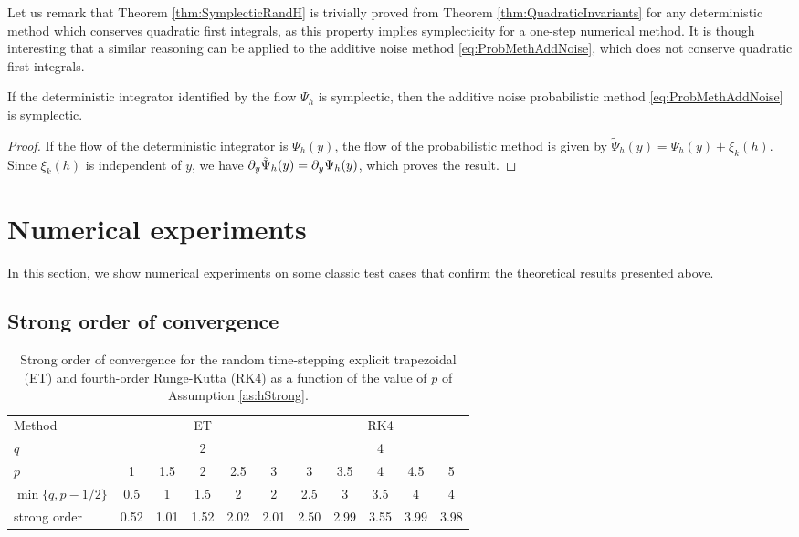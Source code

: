 \documentclass{siamart1116}
\numberwithin{theorem}{section}
\newcommand{\pdv}[2]{\ensuremath\partial_{#2}#1}
\begin{document}
Let us remark that Theorem \ref{thm:SymplecticRandH} is trivially proved from Theorem \ref{thm:QuadraticInvariants} for any deterministic method which conserves quadratic first integrals, as this property implies symplecticity for a one-step numerical method. It is though interesting that a similar reasoning can be applied to the additive noise method \eqref{eq:ProbMethAddNoise}, which does not conserve quadratic first integrals.

\begin{theorem}\label{thm:SymplecticAddNoise} If the deterministic integrator identified by the flow $\Psi_h$ is symplectic, then the additive noise probabilistic method \eqref{eq:ProbMethAddNoise} is symplectic.
\end{theorem}
\begin{proof} If the flow of the deterministic integrator is $\Psi_h(y)$, the flow of the probabilistic method is given by $\tilde\Psi_h(y) = \Psi_h(y) + \xi_k(h)$. Since $\xi_k(h)$ is independent of $y$, we have $\pdv{\tilde\Psi_h(y)}{y} = \pdv{\Psi_h(y)}{y}$, which proves the result.	
\end{proof}

\section{Numerical experiments}\label{sec:NumericalExperiments}

In this section, we show numerical experiments on some classic test cases that confirm the theoretical results presented above. 

\subsection{Strong order of convergence}

\begin{table}[!t]
	\centering
	\begin{tabular}{lcccccccccc}
		\toprule
		Method & \multicolumn{5}{c}{ET} & \multicolumn{5}{c}{RK4} \\ 
		\cmidrule(l{2pt}r{2pt}){2-6} \cmidrule(l{2pt}r{2pt}){7-11} 
		$q$ & \multicolumn{5}{c}{2} & \multicolumn{5}{c}{4} \\
		$p$ & 1 & 1.5 & 2 & 2.5 & 3 & 3 & 3.5 & 4 & 4.5 & 5\\
		$\min\{q, p - 1/2\}$ & 0.5 & 1 & 1.5 & 2 & 2 & 2.5 & 3 & 3.5 & 4 & 4 \\
		strong order & 0.52 & 1.01 & 1.52 & 2.02 & 2.01 & 2.50 & 2.99 & 3.55 & 3.99 & 3.98 \\
		\bottomrule
	\end{tabular}
	\caption{Strong order of convergence for the random time-stepping explicit trapezoidal (ET) and fourth-order Runge-Kutta (RK4) as a function of the value of $p$ of Assumption \ref{as:hStrong}.}
	\label{tab:NumericalResultsStrongOrder}
\end{table}
\end{document}
